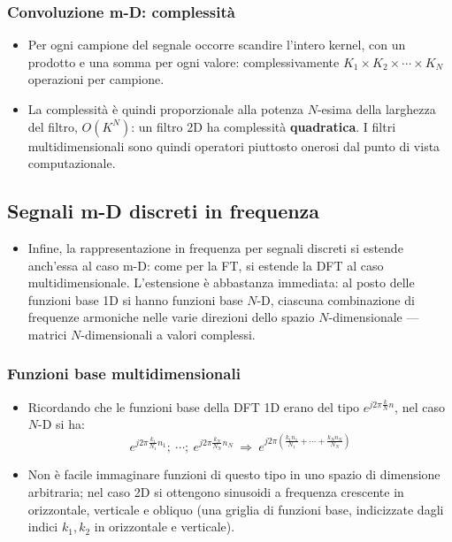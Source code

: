 \documentclass[12pt, a4paper]{article}
\begin{document}
\subsubsection{Convoluzione m-D: complessità}
\begin{itemize}
    \item Per ogni campione del segnale occorre scandire l'intero kernel, con un prodotto e una somma per ogni valore: complessivamente $K_1\times K_2\times\cdots\times K_N$ operazioni per campione.
    \item La complessità è quindi proporzionale alla potenza $N$-esima della larghezza del filtro, $O(K^N)$: un filtro 2D ha complessità \textbf{quadratica}. I filtri multidimensionali sono quindi operatori piuttosto onerosi dal punto di vista computazionale.
\end{itemize}

\subsection{Segnali m-D discreti in frequenza}
\begin{itemize}
    \item Infine, la rappresentazione in frequenza per segnali discreti si estende anch'essa al caso m-D: come per la FT, si estende la DFT al caso multidimensionale. L'estensione è abbastanza immediata: al posto delle funzioni base 1D si hanno funzioni base $N$-D, ciascuna combinazione di frequenze armoniche nelle varie direzioni dello spazio $N$-dimensionale — matrici $N$-dimensionali a valori complessi.
\end{itemize}

\subsubsection{Funzioni base multidimensionali}
\begin{itemize}
    \item Ricordando che le funzioni base della DFT 1D erano del tipo $e^{j2\pi\frac{k}{N}n}$, nel caso $N$-D si ha:
    $$e^{j2\pi\frac{k_1}{N_1}n_1};\ \cdots;\ e^{j2\pi\frac{k_N}{N_N}n_N} \ \Longrightarrow\ e^{j2\pi\left(\frac{k_1n_1}{N_1}+\cdots+\frac{k_Nn_N}{N_N}\right)}$$
    \item Non è facile immaginare funzioni di questo tipo in uno spazio di dimensione arbitraria; nel caso 2D si ottengono sinusoidi a frequenza crescente in orizzontale, verticale e obliquo (una griglia di funzioni base, indicizzate dagli indici $k_1,k_2$ in orizzontale e verticale).
\end{itemize}
\end{document}
